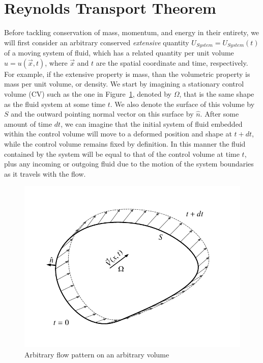 \section{Reynolds Transport Theorem}
Before tackling conservation of mass, momentum, and energy in their entirety, we will first consider an arbitrary conserved {\it extensive} quantity $U_{System} = U_{System}(t)$ of a moving system of fluid, which has a related quantity per unit volume $u = u(\vec{x},t)$, where $\vec{x}$ and $t$ are the spatial coordinate and time, respectively. For example, if the extensive property is mass, than the volumetric property is mass per unit volume, or density. We start by imagining a stationary control volume (CV) such as the one in Figure~\ref{fig:reynolds_transport_volume}, denoted by $\Omega$, that is the same shape as the fluid system at some time $t$. We also denote the surface of this volume by $S$ and the outward pointing normal vector on this surface by $\hat{n}$. After some amount of time $dt$, we can imagine that the initial system of fluid embedded within the control volume will move to a deformed position and shape at $t + dt$, while the control volume remains fixed by definition. In this manner the fluid contained by the system will be equal to that of the control volume at time $t$, plus any incoming or outgoing fluid due to the motion of the system boundaries as it travels with the flow.
\begin{figure}[htbp]
	\centering
	\includegraphics[width=0.5\linewidth]{Pictures/reytrans_volume}
	\caption{Arbitrary flow pattern on an arbitrary volume}
	\label{fig:reynolds_transport_volume}
\end{figure}

